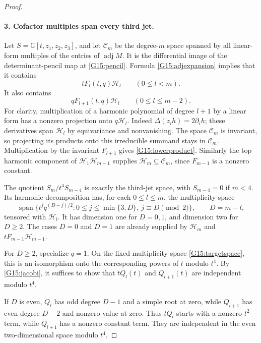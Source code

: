 \begin{proof}
\paragraph{3. Cofactor multiples span every third jet.}
Let $S=\mathbb C[t,z_1,z_2,z_3]$, and let $\mathcal C_m$
be the degree-$m$ space spanned by all linear-form
multiples of the entries of $\operatorname{adj} M$.
It is the differential image of the determinant-pencil
map at \eqref{G15:pencil}. Formula
\eqref{G15:adjexpansion} implies that it contains
\[
 tF_l(t,q)\mathcal H_l\qquad(0\leq l<m).
\]
It also contains
\begin{equation}\label{G15:lowerproduct}
 qF_{l+1}(t,q)\mathcal H_l\qquad(0\leq l\leq m-2).
\end{equation}
For clarity, multiplication of a harmonic polynomial of
degree $l+1$ by a linear form has a nonzero projection
onto $q\mathcal H_l$. Indeed
$\Delta(z_i h)=2\partial_i h$; these derivatives span
$\mathcal H_l$ by equivariance and nonvanishing.
The space $\mathcal C_m$ is invariant, so projecting
its products onto this irreducible summand stays in
$\mathcal C_m$. Multiplication by the invariant
$F_{l+1}$ gives \eqref{G15:lowerproduct}.
Similarly the top harmonic component of
$\mathcal H_1\mathcal H_{m-1}$ supplies
$\mathcal H_m\subseteq\mathcal C_m$, since
$F_{m-1}$ is a nonzero constant.

The quotient $S_m/t^4S_{m-4}$ is exactly the third-jet
space, with $S_{m-4}=0$ if $m<4$. Its harmonic
decomposition has, for each $0\leq l\leq m$, the
multiplicity space
\begin{equation}\label{G15:targetspace}
 \operatorname{span}\{t^j q^{(D-j)/2}:
         0\leq j\leq\min\{3,D\},\ j\equiv D\pmod2\},
 \qquad D=m-l,
\end{equation}
tensored with $\mathcal H_l$. It has dimension one
for $D=0,1$, and dimension two for $D\geq2$.
The cases $D=0$ and $D=1$ are already supplied by
$\mathcal H_m$ and $tF_{m-1}\mathcal H_{m-1}$.

For $D\geq2$, specialize $q=1$. On the fixed
multiplicity space \eqref{G15:targetspace}, this is
an isomorphism onto the corresponding powers of $t$
modulo $t^4$. By \eqref{G15:jacobi}, it suffices to
show that $tQ_l(t)$ and $Q_{l+1}(t)$ are independent
modulo $t^4$.

If $D$ is even, $Q_l$ has odd degree $D-1$ and a
simple root at zero, while $Q_{l+1}$ has even degree
$D-2$ and nonzero value at zero. Thus $tQ_l$ starts
with a nonzero $t^2$ term, while $Q_{l+1}$ has a
nonzero constant term. They are independent in the
even two-dimensional space modulo $t^4$.


\end{proof}
